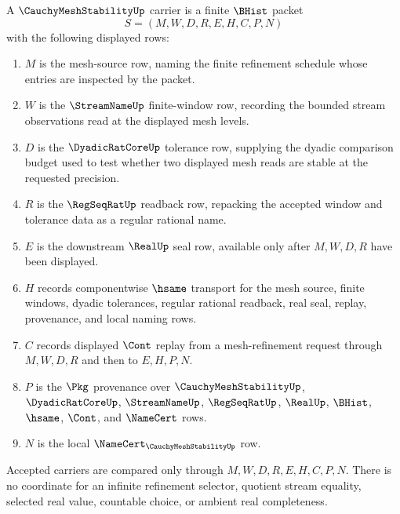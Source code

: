 \begin{definition}
\label{def:cauchy-mesh-stability-carrier}
A $\CauchyMeshStabilityUp$ carrier is a finite $\BHist$ packet
$$
S=(M,W,D,R,E,H,C,P,N)
$$
with the following displayed rows:
\begin{enumerate}
\item $M$ is the mesh-source row, naming the finite refinement schedule whose entries are inspected by the packet.
\item $W$ is the $\StreamNameUp$ finite-window row, recording the bounded stream observations read at the displayed mesh levels.
\item $D$ is the $\DyadicRatCoreUp$ tolerance row, supplying the dyadic comparison budget used to test whether two displayed mesh reads are stable at the requested precision.
\item $R$ is the $\RegSeqRatUp$ readback row, repacking the accepted window and tolerance data as a regular rational name.
\item $E$ is the downstream $\RealUp$ seal row, available only after $M,W,D,R$ have been displayed.
\item $H$ records componentwise $\hsame$ transport for the mesh source, finite windows, dyadic tolerances, regular rational readback, real seal, replay, provenance, and local naming rows.
\item $C$ records displayed $\Cont$ replay from a mesh-refinement request through $M,W,D,R$ and then to $E,H,P,N$.
\item $P$ is the $\Pkg$ provenance over $\CauchyMeshStabilityUp$, $\DyadicRatCoreUp$, $\StreamNameUp$, $\RegSeqRatUp$, $\RealUp$, $\BHist$, $\hsame$, $\Cont$, and $\NameCert$ rows.
\item $N$ is the local $\NameCert_{\CauchyMeshStabilityUp}$ row.
\end{enumerate}
Accepted carriers are compared only through $M,W,D,R,E,H,C,P,N$. There is no coordinate for an infinite refinement selector, quotient stream equality, selected real value, countable choice, or ambient real completeness.
\end{definition}

